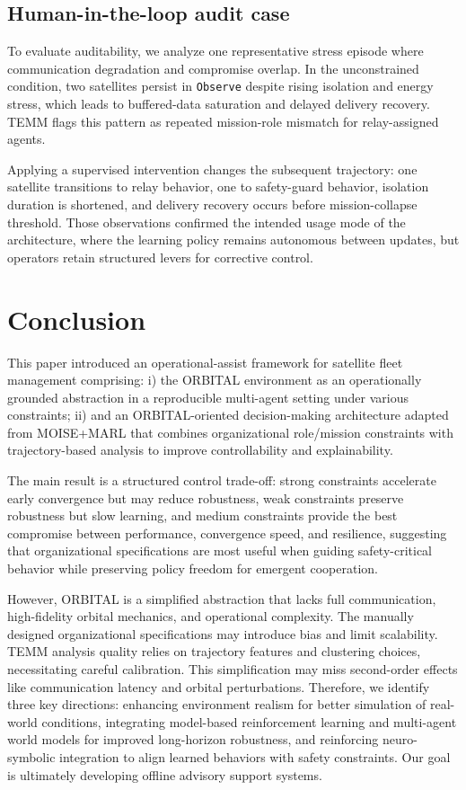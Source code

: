 \documentclass[sigconf]{aamas}
\begin{document}
\subsection{Human-in-the-loop audit case}
To evaluate auditability, we analyze one representative stress episode where communication degradation and compromise overlap. In the unconstrained condition, two satellites persist in \texttt{Observe} despite rising isolation and energy stress, which leads to buffered-data saturation and delayed delivery recovery. TEMM flags this pattern as repeated mission-role mismatch for relay-assigned agents.

Applying a supervised intervention changes the subsequent trajectory: one satellite transitions to relay behavior, one to safety-guard behavior, isolation duration is shortened, and delivery recovery occurs before mission-collapse threshold. Those observations confirmed the intended usage mode of the architecture, where the learning policy remains autonomous between updates, but operators retain structured levers for corrective control.

\section{Conclusion}
\label{sec:conclusion}
This paper introduced an operational-assist framework for satellite fleet management comprising: i) the ORBITAL environment as an operationally grounded abstraction in a reproducible multi-agent setting under various constraints; ii) and an ORBITAL-oriented decision-making architecture adapted from MOISE+MARL that combines organizational role/mission constraints with trajectory-based analysis to improve controllability and explainability.

The main result is a structured control trade-off: strong constraints accelerate early convergence but may reduce robustness, weak constraints preserve robustness but slow learning, and medium constraints provide the best compromise between performance, convergence speed, and resilience, suggesting that organizational specifications are most useful when guiding safety-critical behavior while preserving policy freedom for emergent cooperation.

However, ORBITAL is a simplified abstraction that lacks full communication, high-fidelity orbital mechanics, and operational complexity. The manually designed organizational specifications may introduce bias and limit scalability. TEMM analysis quality relies on trajectory features and clustering choices, necessitating careful calibration. This simplification may miss second-order effects like communication latency and orbital perturbations. Therefore, we identify three key directions: enhancing environment realism for better simulation of real-world conditions, integrating model-based reinforcement learning and multi-agent world models for improved long-horizon robustness, and reinforcing neuro-symbolic integration to align learned behaviors with safety constraints. Our goal is ultimately developing offline advisory support systems.
\end{document}
